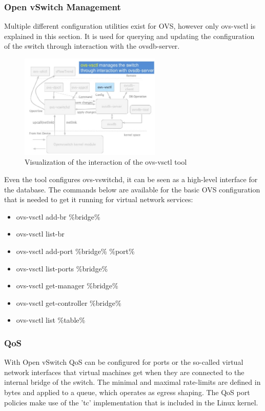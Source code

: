 \subsubsection{Open vSwitch Management}

Multiple different configuration utilities exist for OVS, however only ovs-vsctl is explained in this section. It is used for querying and updating the configuration of the switch through interaction with the ovsdb-server.

\begin{figure}[H]
\centering
\includegraphics[width=0.6\textwidth]{images/fundamentals/openvswitch_vsctl.png}
\caption{Visualization of the interaction of the ovs-vsctl tool}
\end{figure}

Even the tool configures ovs-vswitchd, it can be seen as a high-level interface for the database.
The commands below are available for the basic OVS configuration that is needed to get it running for virtual network services:
\begin{itemize}
\item ovs-vsctl add-br \%bridge\%
\item ovs-vsctl list-br
\item ovs-vsctl add-port \%bridge\% \%port\%
\item ovs-vsctl list-ports \%bridge\%
\item ovs-vsctl get-manager \%bridge\%
\item ovs-vsctl get-controller \%bridge\%
\item ovs-vsctl list \%table\%
\end{itemize}


\subsubsection{QoS}

With Open vSwitch QoS can be configured for ports or the so-called virtual network interfaces that virtual machines get when they are connected to the internal bridge of the switch. The minimal and maximal rate-limits are defined in bytes and applied to a queue, which operates as egress shaping. The QoS port policies make use of the 'tc' implementation that is included in the Linux kernel.


